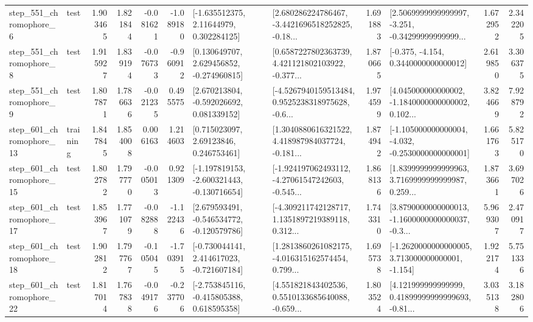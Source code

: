 \begin{tabular}{llrrrrllrlrr}
   step\_551\_chromophore\_6 &      test &      1.903465 &    1.821844 &     -0.081621 & -1.089180 &     [-1.635512375, 2.11644979, 0.302284125] &  [2.680286224786467, -3.4421696518252825, -0.18... &       1.691883 &  [2.5069999999999997, -3.251, -0.34299999999999... &            1.672952 &          2.342205 \\
   step\_551\_chromophore\_8 &      test &      1.915927 &    1.839194 &     -0.076733 & -0.960912 &    [0.130649707, 2.629456852, -0.274960815] &  [0.6587227802363739, 4.421121802103922, -0.377... &       1.870665 &               [-0.375, -4.154, 0.3440000000000012] &            2.619850 &          3.306375 \\
   step\_551\_chromophore\_9 &      test &      1.807871 &    1.786636 &     -0.021235 &  0.495575 &    [2.670213804, -0.592026692, 0.081339152] &  [-4.5267940159513484, 0.9525238318975628, -0.6... &       1.974599 &  [4.045000000000002, -1.1840000000000002, 0.102... &            3.824669 &          7.928792 \\
  step\_601\_chromophore\_13 &  training &      1.847845 &    1.854008 &      0.006163 &  1.214603 &      [0.715023097, 2.69123846, 0.246753461] &  [1.3040880616321522, 4.418987984037724, -0.181... &       1.874942 &  [-1.105000000000004, -4.032, -0.2530000000000001] &            1.661763 &          5.825170 \\
  step\_601\_chromophore\_15 &      test &      1.802782 &    1.797770 &     -0.005013 &  0.921309 &  [-1.197819153, -2.600321443, -0.130716654] &  [-1.924197062493112, -4.27061547242603, -0.545... &       1.868136 &  [1.8399999999999963, 3.7169999999999987, 0.259... &            1.873661 &          3.697026 \\
  step\_601\_chromophore\_17 &      test &      1.853967 &    1.771079 &     -0.082888 & -1.122436 &   [2.679593491, -0.546534772, -0.120579786] &  [-4.309211742128717, 1.1351897219389118, 0.312... &       1.743310 &  [3.8790000000000013, -1.1600000000000037, -0.3... &            5.969307 &          2.470917 \\
  step\_601\_chromophore\_18 &      test &      1.902812 &    1.797767 &     -0.105045 & -1.703915 &   [-0.730044141, 2.414617023, -0.721607184] &  [1.2813860261082175, -4.016315162574454, 0.799... &       1.695738 &   [-1.2620000000000005, 3.713000000000001, -1.154] &            1.922174 &          5.751336 \\
  step\_601\_chromophore\_22 &      test &      1.817014 &    1.767838 &     -0.049176 & -0.237706 &   [-2.753845116, -0.415805388, 0.618595358] &  [4.551821843402536, 0.5510133685640088, -0.659... &       1.803524 &  [4.121999999999999, 0.41899999999999693, -0.81... &            3.035138 &          3.182806 \\

\end{tabular}
